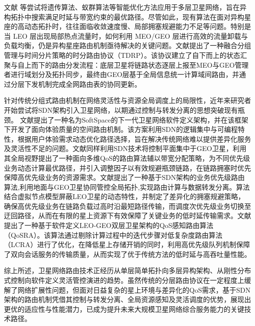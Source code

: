 \documentclass[print, master, vlined]{DissertUESTC}
\begin{document}
    文献\cite{long2010sustainable} 等尝试将遗传算法、蚁群算法等智能优化方法应用于多层卫星网络，旨在异构拓扑中搜索满足时延与带宽约束的最优路径。尽管如此，现有算法在面对异构星座的高动态拓扑时，往往面临收敛速度慢、局部拥塞规避能力不足等问题。特别是当 LEO 层出现局部热点流量时，如何利用 MEO/GEO 层进行高效的流量卸载与负载均衡，仍是异构星座路由机制亟待解决的关键问题。文献\cite{周云晖2008卫星网络}提出了一种融合分组管理与时间分片策略的时分路由协议（TDRP）。该协议建立了自下而上的状态汇聚与自上而下的路由分发流程：底层卫星将链路状态逐层上报至MEO与GEO管理者进行域划分及拓扑同步，最终由GEO层基于全局信息统一计算域间路由，并通过分层下发机制完成全网路由表的协同更新。

    针对传统分组式路由机制在网络灵活性与资源全局调度上的局限性，近年来研究者开始尝试将SDN架构引入卫星网络，以期通过控制与转发分离的思想突破现有瓶颈。
    文献\cite{8258968}提出了一种名为SoftSpace的下一代卫星网络软件定义架构，并在该框架下开发了面向体验质量的空间路由机制。该方案利用SDN的逻辑集中与可编程特性，根据用户体验需求动态优化路径选择，旨在解决传统网络难以提供差异化服务及灵活性不足的问题。文献\cite{li2017service}同样利用SDN技术将控制平面集中于GEO卫星，利用其全局视野提出了一种面向多维QoS的路由算法辅以带宽分配策略，为不同优先级业务动态计算最优路径，并引入调整因子以有效规避瓶颈链路，在链路拥塞时优先保障高优先级业务的资源需求。文献\cite{1021025190.nh}提出了一种基于SDN架构的业务优先级路由算法,利用地面与GEO卫星协同管控全局拓扑,实现路由计算与数据转发分离。算法结合虚拟节点模型屏蔽LEO卫星的动态特性，并制定了差异化的拥塞规避策略，确保高优先级业务在链路负载过高时沿最短路径传输，而调度次优先级业务切换至迂回路径，从而在有限的星上资源下有效保障了关键业务的低时延传输需求。文献\cite{9441632}提出了一种基于软件定义LEO-GEO双层卫星架构的QoS感知路由算法（QoSRA）。该算法通过剔除计算过程中的迭代步骤对低复杂度路由算法（LCRA）进行了优化，在降低星上存储开销的同时，利用高优先级队列机制保障了双向会话服务的传输质量，从而实现了优于传统方法的低时延与高吞吐量性能。

    综上所述，卫星网络路由技术正经历从单层简单拓扑向多层异构架构、从刚性分布式控制向软件定义灵活管控演进的趋势。虽然传统的分层路由协议在一定程度上缓解了网络扩展性问题，但面对日益复杂的星上环境与差异化的QoS需求，基于SDN架构的路由机制凭借其控制与转发分离、全局资源感知及灵活调度的优势，展现出更优的适应性与性能潜力，已成为提升未来大规模卫星网络综合服务能力的关键技术路径。
    
\end{document}
